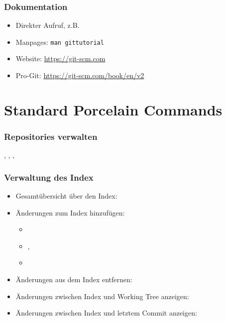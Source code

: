 \documentclass{cms-kurs}
\begin{document}
\begin{frame}
  \frametitle{Dokumentation}

  \onslide<+->

  \begin{itemize}
  \item Direkter Aufruf, z.B.{} 
  \item Manpages: \lstinline{man gittutorial}
  \item Website: \url{https://git-scm.com}
  \item Pro-Git: \url{https://git-scm.com/book/en/v2}
  \end{itemize}

\end{frame}

\section{Standard Porcelain Commands}

\begin{frame}
  \frametitle{Repositories verwalten}

  \onslide<+->

  , , , 

\end{frame}

\begin{frame}
  \frametitle{Verwaltung des Index}

  \onslide<+->

  \begin{itemize}
  \item Gesamtübersicht über den Index: 
  \item Änderungen zum Index hinzufügen:
    \begin{itemize}
    \item {}
    \item {}, 
    \item {}
    \end{itemize}
  \item Änderungen aus dem Index entfernen: 
  \item Änderungen zwischen Index und Working Tree anzeigen: 
  \item Änderungen zwischen Index und letztem Commit anzeigen: 
  \end{itemize}

\end{frame}
\end{document}
